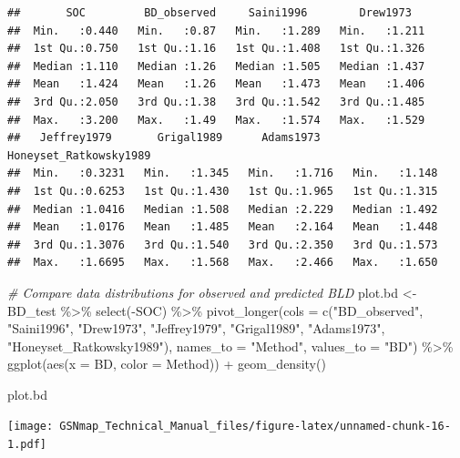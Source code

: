 \documentclass[
  10pt,
  b5paper,
  oneside]{book}
\newenvironment{Shaded}{\begin{snugshade}}{\end{snugshade}}
\newcommand{\AttributeTok}[1]{\textcolor[rgb]{0.77,0.63,0.00}{#1}}
\newcommand{\CommentTok}[1]{\textcolor[rgb]{0.56,0.35,0.01}{\textit{#1}}}
\newcommand{\FunctionTok}[1]{\textcolor[rgb]{0.00,0.00,0.00}{#1}}
\newcommand{\NormalTok}[1]{#1}
\newcommand{\OtherTok}[1]{\textcolor[rgb]{0.56,0.35,0.01}{#1}}
\newcommand{\SpecialCharTok}[1]{\textcolor[rgb]{0.00,0.00,0.00}{#1}}
\newcommand{\StringTok}[1]{\textcolor[rgb]{0.31,0.60,0.02}{#1}}
\begin{document}
\begin{verbatim}
##       SOC         BD_observed     Saini1996        Drew1973    
##  Min.   :0.440   Min.   :0.87   Min.   :1.289   Min.   :1.211  
##  1st Qu.:0.750   1st Qu.:1.16   1st Qu.:1.408   1st Qu.:1.326  
##  Median :1.110   Median :1.26   Median :1.505   Median :1.437  
##  Mean   :1.424   Mean   :1.26   Mean   :1.473   Mean   :1.406  
##  3rd Qu.:2.050   3rd Qu.:1.38   3rd Qu.:1.542   3rd Qu.:1.485  
##  Max.   :3.200   Max.   :1.49   Max.   :1.574   Max.   :1.529  
##   Jeffrey1979       Grigal1989      Adams1973     Honeyset_Ratkowsky1989
##  Min.   :0.3231   Min.   :1.345   Min.   :1.716   Min.   :1.148         
##  1st Qu.:0.6253   1st Qu.:1.430   1st Qu.:1.965   1st Qu.:1.315         
##  Median :1.0416   Median :1.508   Median :2.229   Median :1.492         
##  Mean   :1.0176   Mean   :1.485   Mean   :2.164   Mean   :1.448         
##  3rd Qu.:1.3076   3rd Qu.:1.540   3rd Qu.:2.350   3rd Qu.:1.573         
##  Max.   :1.6695   Max.   :1.568   Max.   :2.466   Max.   :1.650
\end{verbatim}

\begin{Shaded}
\begin{Highlighting}[]
\CommentTok{\# Compare data distributions for observed and predicted BLD}
\NormalTok{plot.bd }\OtherTok{\textless{}{-}}\NormalTok{ BD\_test }\SpecialCharTok{\%\textgreater{}\%}
  \FunctionTok{select}\NormalTok{(}\SpecialCharTok{{-}}\NormalTok{SOC) }\SpecialCharTok{\%\textgreater{}\%} 
  \FunctionTok{pivot\_longer}\NormalTok{(}\AttributeTok{cols =} \FunctionTok{c}\NormalTok{(}\StringTok{"BD\_observed"}\NormalTok{, }\StringTok{"Saini1996"}\NormalTok{, }\StringTok{"Drew1973"}\NormalTok{, }\StringTok{"Jeffrey1979"}\NormalTok{,}
                        \StringTok{"Grigal1989"}\NormalTok{, }\StringTok{"Adams1973"}\NormalTok{, }\StringTok{"Honeyset\_Ratkowsky1989"}\NormalTok{), }
               \AttributeTok{names\_to =} \StringTok{"Method"}\NormalTok{, }\AttributeTok{values\_to =} \StringTok{"BD"}\NormalTok{) }\SpecialCharTok{\%\textgreater{}\%} 
  \FunctionTok{ggplot}\NormalTok{(}\FunctionTok{aes}\NormalTok{(}\AttributeTok{x =}\NormalTok{ BD, }\AttributeTok{color =}\NormalTok{ Method)) }\SpecialCharTok{+} 
  \FunctionTok{geom\_density}\NormalTok{()}

\NormalTok{plot.bd}
\end{Highlighting}
\end{Shaded}

\texttt{[image: GSNmap\_Technical\_Manual\_files/figure-latex/unnamed-chunk-16-1.pdf]}
\end{document}
